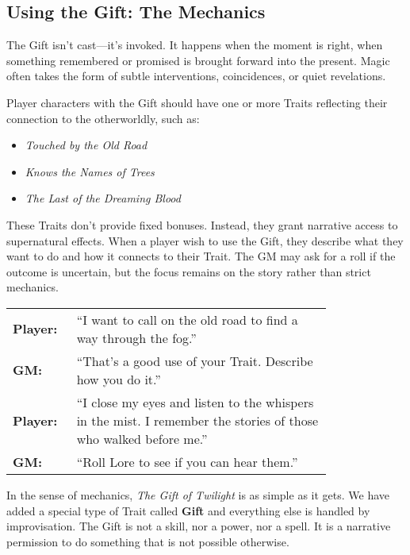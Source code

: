 \subsection{Using the Gift: The Mechanics}

The Gift isn’t cast—it’s invoked. It happens when the moment is right, when something remembered or promised is brought forward into the present. Magic often takes the form of subtle interventions, coincidences, or quiet revelations.

Player characters with the Gift should have one or more Traits reflecting their connection to the otherworldly, such as:  
\begin{Example}
    \begin{itemize}
        \item \textit{Touched by the Old Road}  
        \item \textit{Knows the Names of Trees}  
        \item \textit{The Last of the Dreaming Blood}  
    \end{itemize}
\end{Example}

These Traits don’t provide fixed bonuses. Instead, they grant narrative access to supernatural effects. When a player wish to use the Gift, they describe what they want to do and how it connects to their Trait. The GM may ask for a roll if the outcome is uncertain, but the focus remains on the story rather than strict mechanics.

\begin{Example}
    \begin{tabular}{@{}l p{0.8\linewidth}@{}}
        \textbf{Player:} & “I want to call on the old road to find a way through the fog.”  \\
        \textbf{GM:} & “That’s a good use of your Trait. Describe how you do it.” \\
        \textbf{Player:} & “I close my eyes and listen to the whispers in the mist. I remember the stories of those who walked before me.”  \\
        \textbf{GM:} & “Roll Lore to see if you can hear them.”
    \end{tabular}    
\end{Example}

In the sense of mechanics, \emph{The Gift of Twilight} is as simple as it gets. We have added a special type of Trait called \textbf{Gift} and everything else is handled by improvisation. The Gift is not a skill, nor a power, nor a spell. It is a narrative permission to do something that is not possible otherwise.


